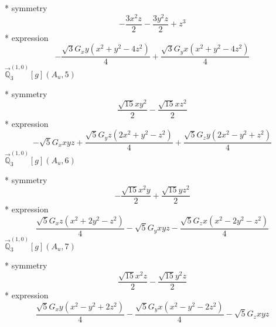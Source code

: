 \documentclass[fleqn,8pt]{jsarticle}
\begin{document}
\noindent\quad ** symmetry
\begin{dmath*}
- \frac{3 x^{2} z}{2} - \frac{3 y^{2} z}{2} + z^{3}
\end{dmath*}
\noindent\quad ** expression
\begin{dmath*}
- \frac{\sqrt{3} G_{x} y \left(x^{2} + y^{2} - 4 z^{2}\right)}{4} + \frac{\sqrt{3} G_{y} x \left(x^{2} + y^{2} - 4 z^{2}\right)}{4}
\end{dmath*}
\noindent\quad $\vec{\mathbb{Q}}_{3}^{(1,0)}[g](A_{u},5)$

\noindent\quad ** symmetry
\begin{dmath*}
\frac{\sqrt{15} x y^{2}}{2} - \frac{\sqrt{15} x z^{2}}{2}
\end{dmath*}
\noindent\quad ** expression
\begin{dmath*}
- \sqrt{5} G_{x} x y z + \frac{\sqrt{5} G_{y} z \left(2 x^{2} + y^{2} - z^{2}\right)}{4} + \frac{\sqrt{5} G_{z} y \left(2 x^{2} - y^{2} + z^{2}\right)}{4}
\end{dmath*}
\noindent\quad $\vec{\mathbb{Q}}_{3}^{(1,0)}[g](A_{u},6)$

\noindent\quad ** symmetry
\begin{dmath*}
- \frac{\sqrt{15} x^{2} y}{2} + \frac{\sqrt{15} y z^{2}}{2}
\end{dmath*}
\noindent\quad ** expression
\begin{dmath*}
\frac{\sqrt{5} G_{x} z \left(x^{2} + 2 y^{2} - z^{2}\right)}{4} - \sqrt{5} G_{y} x y z - \frac{\sqrt{5} G_{z} x \left(x^{2} - 2 y^{2} - z^{2}\right)}{4}
\end{dmath*}
\noindent\quad $\vec{\mathbb{Q}}_{3}^{(1,0)}[g](A_{u},7)$

\noindent\quad ** symmetry
\begin{dmath*}
\frac{\sqrt{15} x^{2} z}{2} - \frac{\sqrt{15} y^{2} z}{2}
\end{dmath*}
\noindent\quad ** expression
\begin{dmath*}
\frac{\sqrt{5} G_{x} y \left(x^{2} - y^{2} + 2 z^{2}\right)}{4} - \frac{\sqrt{5} G_{y} x \left(x^{2} - y^{2} - 2 z^{2}\right)}{4} - \sqrt{5} G_{z} x y z
\end{dmath*}
\end{document}
